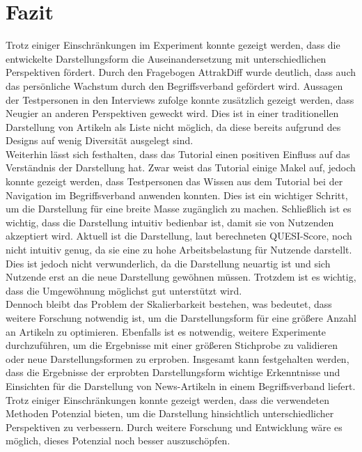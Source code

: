 \section{Fazit}\label{sec:conclusion}
Trotz einiger Einschränkungen im Experiment konnte gezeigt werden, dass die entwickelte Darstellungsform die Auseinandersetzung mit unterschiedlichen Perspektiven fördert.
Durch den Fragebogen AttrakDiff wurde deutlich, dass auch das persönliche Wachstum durch den Begriffsverband gefördert wird.
Aussagen der Testpersonen in den Interviews zufolge konnte zusätzlich gezeigt werden, dass Neugier an anderen Perspektiven geweckt wird.
Dies ist in einer traditionellen Darstellung von Artikeln als Liste nicht möglich, da diese bereits aufgrund des Designs auf wenig Diversität ausgelegt sind.\\

Weiterhin lässt sich festhalten, dass das Tutorial einen positiven Einfluss auf das Verständnis der Darstellung hat.
Zwar weist das Tutorial einige Makel auf, jedoch konnte gezeigt werden, dass Testpersonen das Wissen aus dem Tutorial bei der Navigation im Begriffsverband anwenden konnten.
Dies ist ein wichtiger Schritt, um die Darstellung für eine breite Masse zugänglich zu machen.
Schließlich ist es wichtig, dass die Darstellung intuitiv bedienbar ist, damit sie von Nutzenden akzeptiert wird.
Aktuell ist die Darstellung, laut berechneten \ac{QUESI}-Score, noch nicht intuitiv genug, da sie eine zu hohe Arbeitsbelastung für Nutzende darstellt.
Dies ist jedoch nicht verwunderlich, da die Darstellung neuartig ist und sich Nutzende erst an die neue Darstellung gewöhnen müssen.
Trotzdem ist es wichtig, dass die Umgewöhnung möglichst gut unterstützt wird. \\

Dennoch bleibt das Problem der Skalierbarkeit bestehen, was bedeutet, dass weitere Forschung notwendig ist, um die Darstellungsform für eine größere Anzahl an Artikeln zu optimieren.
Ebenfalls ist es notwendig, weitere Experimente durchzuführen, um die Ergebnisse mit einer größeren Stichprobe zu validieren oder neue Darstellungsformen zu erproben.
Insgesamt kann festgehalten werden, dass die Ergebnisse der erprobten Darstellungsform wichtige Erkenntnisse und Einsichten für die Darstellung von News-Artikeln in einem Begriffsverband liefert.
Trotz einiger Einschränkungen konnte gezeigt werden, dass die verwendeten Methoden Potenzial bieten, um die Darstellung hinsichtlich unterschiedlicher Perspektiven zu verbessern.
Durch weitere Forschung und Entwicklung wäre es möglich, dieses Potenzial noch besser auszuschöpfen.
